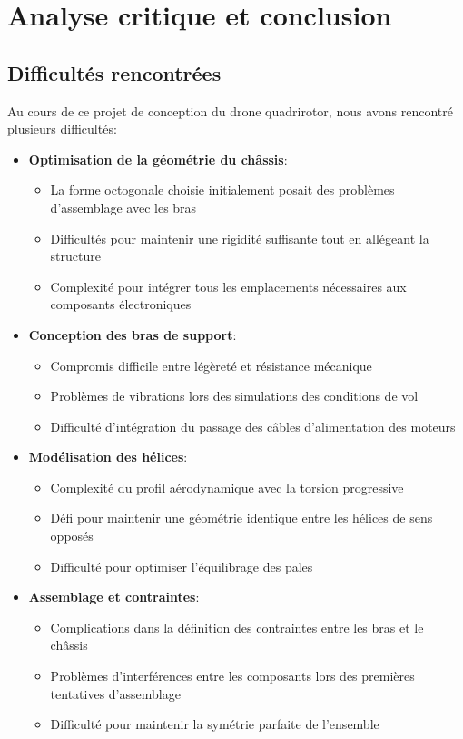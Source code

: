 \documentclass[a4paper,12pt]{report}
\begin{document}
\chapter{Analyse critique et conclusion}
\section{Difficultés rencontrées}
Au cours de ce projet de conception du drone quadrirotor, nous avons rencontré plusieurs difficultés:

\begin{itemize}
    \item \textbf{Optimisation de la géométrie du châssis}:
    \begin{itemize}
        \item La forme octogonale choisie initialement posait des problèmes d'assemblage avec les bras
        \item Difficultés pour maintenir une rigidité suffisante tout en allégeant la structure
        \item Complexité pour intégrer tous les emplacements nécessaires aux composants électroniques
    \end{itemize}
    
    \item \textbf{Conception des bras de support}:
    \begin{itemize}
        \item Compromis difficile entre légèreté et résistance mécanique
        \item Problèmes de vibrations lors des simulations des conditions de vol
        \item Difficulté d'intégration du passage des câbles d'alimentation des moteurs
    \end{itemize}
    
    \item \textbf{Modélisation des hélices}:
    \begin{itemize}
        \item Complexité du profil aérodynamique avec la torsion progressive
        \item Défi pour maintenir une géométrie identique entre les hélices de sens opposés
        \item Difficulté pour optimiser l'équilibrage des pales
    \end{itemize}
    
    \item \textbf{Assemblage et contraintes}:
    \begin{itemize}
        \item Complications dans la définition des contraintes entre les bras et le châssis
        \item Problèmes d'interférences entre les composants lors des premières tentatives d'assemblage
        \item Difficulté pour maintenir la symétrie parfaite de l'ensemble
    \end{itemize}
\end{itemize}
\end{document}
